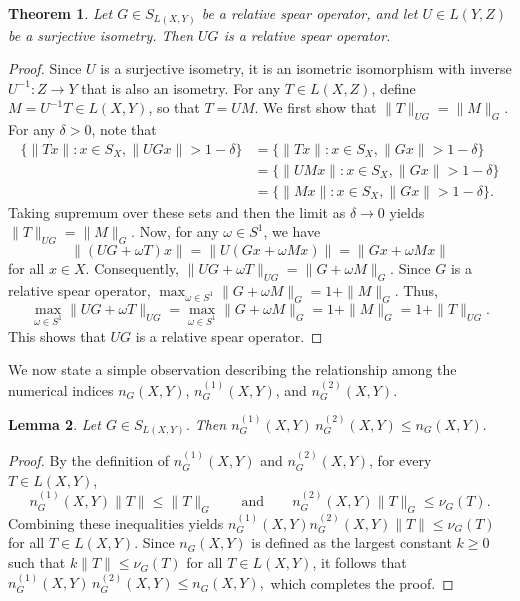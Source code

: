 \documentclass[12pt]{amsart}
\newtheorem{theorem}{Theorem}[section]
\newtheorem{lemma}[theorem]{Lemma}
\theoremstyle{definition}
\numberwithin{equation}{section}
\begin{document}
	
	\begin{theorem}
		Let $G \in  S_{L(X, Y)}$ be a relative spear operator, and let $U \in L(Y,Z)$ be a surjective isometry. Then $U G$ is a relative spear operator.
	\end{theorem}
	\begin{proof}
		Since $U$ is a surjective isometry, it is an isometric isomorphism with inverse $U^{-1}: Z \to Y$ that is also an isometry. For any $T \in L(X, Z)$, define $M = U^{-1} T \in  L(X, Y)$, so that $T = U M$. We first show that $\|T\|_{U G} = \|M\|_G$. For any $\delta > 0$, note that 
		\begin{align*}
			\{\|Tx\|: x \in S_X, \|U G x\| > 1 - \delta\} & = \{\|Tx\|: x \in S_X, \|G x\| > 1 - \delta\}\\
			& =\{\|U Mx\|: x \in S_X, \|G x\| > 1 - \delta\}\\
			& =\{\|Mx\|: x \in S_X, \|G x\| > 1 - \delta\}.
		\end{align*}
		Taking supremum over these sets and then the limit as $\delta \to 0$ yields $\|T\|_{U G} = \|M\|_G$. Now, for any $\omega \in S^1$, we have
		\[
		\|(U G + \omega T) x\| = \|U (G x + \omega M x)\| = \|G x + \omega M x\|
		\]
		for all $x \in X$. Consequently, $\|U G + \omega T\|_{U G} = \|G + \omega M\|_G.$ Since $G$ is a relative spear operator, $\max_{\omega\in S^1}\|G + \omega M\|_G = 1 + \|M\|_G.$ Thus,
		\[
		\max_{\omega \in S^1} \|U G + \omega T\|_{U G} = \max_{\omega \in S^1} \|G + \omega M\|_G = 1 + \|M\|_G = 1 + \|T\|_{U G}.
		\]
		This shows that $U G$ is a relative spear operator.
	\end{proof}
	
	We now state a simple observation describing the relationship among the numerical indices $n_G(X, Y)$, $n^{(1)}_G(X, Y)$, and $n^{(2)}_G(X, Y)$.
	
	\begin{lemma}\label{L3}
		Let $G\in S_{ L(X, Y )}$. Then $n_G^{(1)}(X,Y)\, n_G^{(2)}(X,Y)\le n_G(X,Y).$
	\end{lemma}
	
	\begin{proof}
		By the definition of $n_G^{(1)}(X,Y)$ and $n_G^{(2)}(X,Y)$, for every
		$T\in L(X, Y )$,
		\[
		n_G^{(1)}(X,Y)\|T\|\le \|T\|_G
		\qquad\text{and}\qquad
		n_G^{(2)}(X,Y)\|T\|_G\le \nu_G(T).
		\]
		Combining these inequalities yields $n_G^{(1)}(X,Y) n_G^{(2)}(X,Y) \|T\|\le \nu_G(T)$ for all $T\in L(X, Y ).$ Since $n_G(X,Y)$ is defined as the largest constant $k\ge 0$ such that $k\|T\|\le \nu_G(T)$ for all $T\in L(X, Y )$, it follows that $n_G^{(1)}(X,Y)\, n_G^{(2)}(X,Y)\le n_G(X,Y),$ which completes the proof.
	\end{proof}
			
\end{document}
